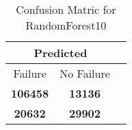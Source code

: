 \begin{table}[] 
\caption{Confusion Matric for RandomForest10} 
\label{Table: Prediction Accuracy-DMDRandomForest10OnlySunEKF-combinationReflection-Reflection} 
\centering 
\begin{tabular} 
 {@{}ccc@{}} 
\toprule 
\multicolumn{2}{c}{\textbf{Predicted}}
 \\ \midrule 
\multicolumn{1}{|c|}{Failure} & 
\multicolumn{1}{c|}{No Failure}
 \\ \midrule 
\multicolumn{1}{|c|}{\color{green}\textbf{106458}} & 
\multicolumn{1}{c|}{\color{red}\textbf{13136}}
 \\ \midrule 
\multicolumn{1}{|c|}{\color{red}\textbf{20632}} & 
\multicolumn{1}{c|}{\color{green}\textbf{29902}}
 \\ \bottomrule 
\end{tabular} 
\end{table} 
